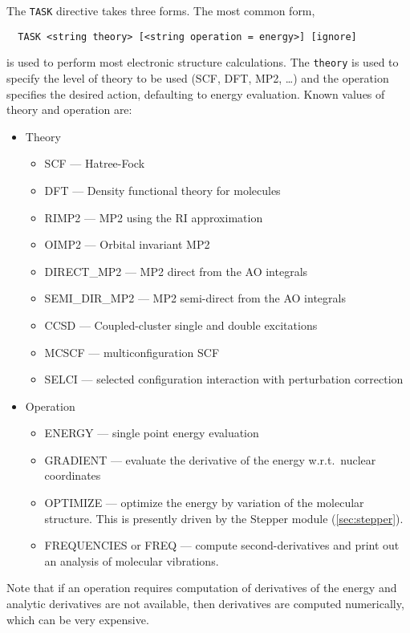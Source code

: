 The \verb+TASK+ directive takes three forms.  The most common form,
\begin{verbatim}
  TASK <string theory> [<string operation = energy>] [ignore]
\end{verbatim}
is used to perform most electronic structure calculations.  The
\verb+theory+ is used to specify the level of theory to be used (SCF,
DFT, MP2, \ldots) and the operation specifies the desired action,
defaulting to energy evaluation.  Known values of theory and operation
are:
\begin{itemize}
\item Theory \newline
\begin{itemize}
 \item SCF --- Hatree-Fock
 \item DFT --- Density functional theory for molecules
 \item RIMP2 --- MP2 using the RI approximation
 \item OIMP2 --- Orbital invariant MP2
 \item DIRECT\_MP2 --- MP2 direct from the AO integrals
 \item SEMI\_DIR\_MP2 --- MP2 semi-direct from the AO integrals
 \item CCSD --- Coupled-cluster single and double excitations
 \item MCSCF --- multiconfiguration SCF
 \item SELCI --- selected configuration interaction with perturbation
   correction 
\end{itemize}
\item Operation \newline
\begin{itemize}
 \item ENERGY --- single point energy evaluation
 \item GRADIENT --- evaluate the derivative of the energy w.r.t.\
   nuclear coordinates
 \item OPTIMIZE --- optimize the energy by variation of the molecular
   structure.  This is presently driven by the Stepper module
   (\ref{sec:stepper}). 
 \item FREQUENCIES or FREQ --- compute second-derivatives and print
   out an analysis of molecular vibrations.
\end{itemize} 
\end{itemize}
Note that if an operation requires computation of derivatives of the
energy and analytic derivatives are not available, then derivatives
are computed numerically, which can be very expensive.

